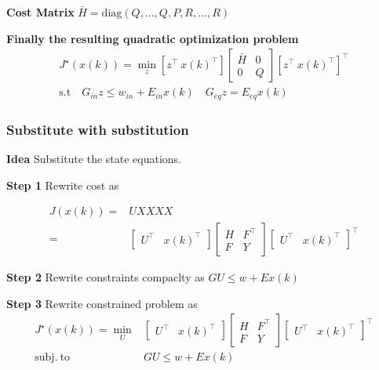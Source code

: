 \textbf{Cost Matrix} $\bar{H} = \mathrm{diag}(Q,..., Q, P, R,..., R)$

\textbf{Finally the resulting quadratic optimization problem}
\[\begin{aligned}
		J^\star(x(k)) = \min_z  \left[ z^\top \ x(k)^\top \right]
		\left[\begin{smallmatrix} \bar{H} & 0 \\ 0 & Q \end{smallmatrix}\right]
		\left[ z^\top \ x(k)^\top \right]^\top \\
		\text{s.t}
		\quad G_{in}z \leq w_{in} + E_{in}x(k)
		\quad	G_{eq}z = E_{eq}x(k)
	\end{aligned}\]

\subsubsection{Substitute with substitution}

\textbf{Idea} Substitute the state equations.

\textbf{Step 1} Rewrite cost  as

\[\begin{aligned}
		J(x(k)) = & UXXXX              \\
		=         & \begin{bmatrix}
			            U^\top & x(k)^\top
		            \end{bmatrix}
		\left[\begin{smallmatrix}
				      H & F^\top \\
				      F & Y
			      \end{smallmatrix}\right]
		\begin{bmatrix}
			U^\top & x(k)^\top
		\end{bmatrix}^\top
	\end{aligned} \]

\textbf{Step 2} Rewrite constraints compaclty as $GU\le w+Ex(k)$

\textbf{Step 3} Rewrite constrained problem as
\[\begin{aligned}
		J^\star(x(k)) = \min_U
		                       & \begin{bmatrix}
			                         U^\top & x(k)^\top
		                         \end{bmatrix}
		\left[\begin{smallmatrix}
				      H & F^\top \\
				      F & Y
			      \end{smallmatrix}\right]
		\begin{bmatrix}
			U^\top & x(k)^\top
		\end{bmatrix}^\top                          \\
		\mathrm{subj. \ to \ } & GU \leq w + Ex(k)
	\end{aligned} \]

